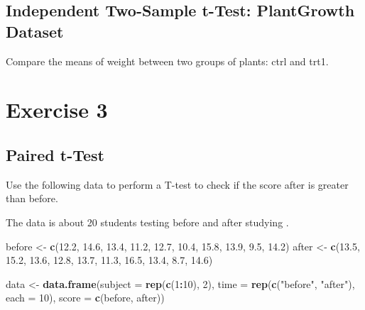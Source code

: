 \documentclass[
]{book}
\newenvironment{Shaded}{\begin{snugshade}}{\end{snugshade}}
\newcommand{\AttributeTok}[1]{\textcolor[rgb]{0.13,0.29,0.53}{#1}}
\newcommand{\DecValTok}[1]{\textcolor[rgb]{0.00,0.00,0.81}{#1}}
\newcommand{\FloatTok}[1]{\textcolor[rgb]{0.00,0.00,0.81}{#1}}
\newcommand{\FunctionTok}[1]{\textcolor[rgb]{0.13,0.29,0.53}{\textbf{#1}}}
\newcommand{\NormalTok}[1]{#1}
\newcommand{\OtherTok}[1]{\textcolor[rgb]{0.56,0.35,0.01}{#1}}
\newcommand{\SpecialCharTok}[1]{\textcolor[rgb]{0.81,0.36,0.00}{\textbf{#1}}}
\newcommand{\StringTok}[1]{\textcolor[rgb]{0.31,0.60,0.02}{#1}}
\begin{document}
\subsection*{Independent Two-Sample t-Test: PlantGrowth Dataset}\label{independent-two-sample-t-test-plantgrowth-dataset}

Compare the means of weight between two groups of plants: ctrl and trt1.

\section*{Exercise 3}\label{exercise-3-2}

\subsection{Paired t-Test}\label{paired-t-test}

Use the following data to perform a T-test to check if the score after is greater than before.

The data is about 20 students testing before and after studying .

\begin{Shaded}
\begin{Highlighting}[]
\NormalTok{before }\OtherTok{\textless{}{-}} \FunctionTok{c}\NormalTok{(}\FloatTok{12.2}\NormalTok{, }\FloatTok{14.6}\NormalTok{, }\FloatTok{13.4}\NormalTok{, }\FloatTok{11.2}\NormalTok{, }\FloatTok{12.7}\NormalTok{, }\FloatTok{10.4}\NormalTok{, }\FloatTok{15.8}\NormalTok{, }\FloatTok{13.9}\NormalTok{, }\FloatTok{9.5}\NormalTok{, }\FloatTok{14.2}\NormalTok{)}
\NormalTok{after }\OtherTok{\textless{}{-}} \FunctionTok{c}\NormalTok{(}\FloatTok{13.5}\NormalTok{, }\FloatTok{15.2}\NormalTok{, }\FloatTok{13.6}\NormalTok{, }\FloatTok{12.8}\NormalTok{, }\FloatTok{13.7}\NormalTok{, }\FloatTok{11.3}\NormalTok{, }\FloatTok{16.5}\NormalTok{, }\FloatTok{13.4}\NormalTok{, }\FloatTok{8.7}\NormalTok{, }\FloatTok{14.6}\NormalTok{)}
\end{Highlighting}
\end{Shaded}

\begin{Shaded}
\begin{Highlighting}[]
\NormalTok{data }\OtherTok{\textless{}{-}} \FunctionTok{data.frame}\NormalTok{(}\AttributeTok{subject =} \FunctionTok{rep}\NormalTok{(}\FunctionTok{c}\NormalTok{(}\DecValTok{1}\SpecialCharTok{:}\DecValTok{10}\NormalTok{), }\DecValTok{2}\NormalTok{), }
                   \AttributeTok{time =} \FunctionTok{rep}\NormalTok{(}\FunctionTok{c}\NormalTok{(}\StringTok{"before"}\NormalTok{, }\StringTok{"after"}\NormalTok{), }\AttributeTok{each =} \DecValTok{10}\NormalTok{),}
                   \AttributeTok{score =} \FunctionTok{c}\NormalTok{(before, after))}
\end{Highlighting}
\end{Shaded}
\end{document}
